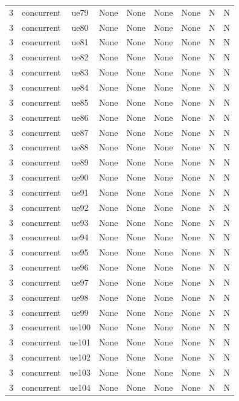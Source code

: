 \begin{table}[ht]
\begin{tabular}{|c|c|c|c|c|c|c|c|c|}
3 & concurrent & ue79 & None & None & None & None & N & N \\
3 & concurrent & ue80 & None & None & None & None & N & N \\
3 & concurrent & ue81 & None & None & None & None & N & N \\
3 & concurrent & ue82 & None & None & None & None & N & N \\
3 & concurrent & ue83 & None & None & None & None & N & N \\
3 & concurrent & ue84 & None & None & None & None & N & N \\
3 & concurrent & ue85 & None & None & None & None & N & N \\
3 & concurrent & ue86 & None & None & None & None & N & N \\
3 & concurrent & ue87 & None & None & None & None & N & N \\
3 & concurrent & ue88 & None & None & None & None & N & N \\
3 & concurrent & ue89 & None & None & None & None & N & N \\
3 & concurrent & ue90 & None & None & None & None & N & N \\
3 & concurrent & ue91 & None & None & None & None & N & N \\
3 & concurrent & ue92 & None & None & None & None & N & N \\
3 & concurrent & ue93 & None & None & None & None & N & N \\
3 & concurrent & ue94 & None & None & None & None & N & N \\
3 & concurrent & ue95 & None & None & None & None & N & N \\
3 & concurrent & ue96 & None & None & None & None & N & N \\
3 & concurrent & ue97 & None & None & None & None & N & N \\
3 & concurrent & ue98 & None & None & None & None & N & N \\
3 & concurrent & ue99 & None & None & None & None & N & N \\
3 & concurrent & ue100 & None & None & None & None & N & N \\
3 & concurrent & ue101 & None & None & None & None & N & N \\
3 & concurrent & ue102 & None & None & None & None & N & N \\
3 & concurrent & ue103 & None & None & None & None & N & N \\
3 & concurrent & ue104 & None & None & None & None & N & N \\

\end{tabular}
\end{table}
